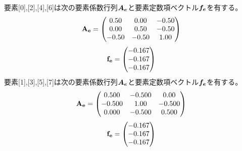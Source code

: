 \documentclass[a4paper,11pt]{jsarticle}
\begin{document}
要素[0],[2],[4],[6]は次の要素係数行列\(\vb*{A_{e}}\)と要素定数項ベクトル\(\vb*{f_{e}}\)を有する。
\begin{align}
  \vb{A_{e}} = \mqty(0.50 & 0.00 & -0.50 \\ 0.00 & 0.50 & -0.50 \\ -0.50 & -0.50 & 1.00)
\end{align}
\begin{align}
  \vb{f_{e}} = \mqty(-0.167 \\ -0.167 \\ -0.167)
\end{align} 
要素[1],[3],[5],[7]は次の要素係数行列\(\vb*{A_{e}}\)と要素定数項ベクトル\(\vb*{f_{e}}\)を有する。
\begin{align}
  \vb{A_{e}} = \mqty(0.500 & -0.500 & 0.00 \\ -0.500 & 1.00 & -0.500 \\ 0.000 & -0.500 & 0.500)
\end{align}
\begin{align}
  \vb{f_{e}} = \mqty(-0.167 \\ -0.167 \\ -0.167)
\end{align}
\end{document}
